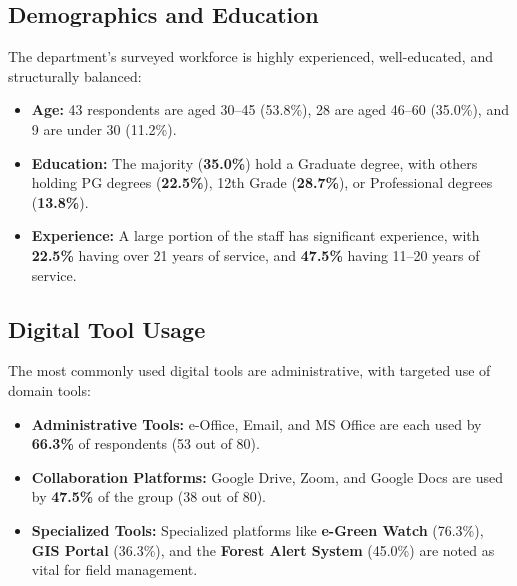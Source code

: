 \documentclass[10pt,a4paper]{article}
\begin{document}
\noindent\begin{minipage}[t]{0.49\textwidth}
\subsection{Demographics and Education}
The department's surveyed workforce is highly experienced, well-educated, and structurally balanced:
\begin{itemize}
  \item \textbf{Age:} 43 respondents are aged 30--45 (53.8\%), 28 are aged 46--60 (35.0\%), and 9 are under 30 (11.2\%).
  \item \textbf{Education:} The majority (\textbf{35.0\%}) hold a Graduate degree, with others holding PG degrees (\textbf{22.5\%}), 12th Grade (\textbf{28.7\%}), or Professional degrees (\textbf{13.8\%}).
  \item \textbf{Experience:} A large portion of the staff has significant experience, with \textbf{22.5\%} having over 21 years of service, and \textbf{47.5\%} having 11--20 years of service.
\end{itemize}
\end{minipage}
\hfill
\begin{minipage}[t]{0.49\textwidth}
\subsection{Digital Tool Usage}
The most commonly used digital tools are administrative, with targeted use of domain tools:
\begin{itemize}
  \item \textbf{Administrative Tools:} e-Office, Email, and MS Office are each used by \textbf{66.3\%} of respondents (53 out of 80).
  \item \textbf{Collaboration Platforms:} Google Drive, Zoom, and Google Docs are used by \textbf{47.5\%} of the group (38 out of 80).
  \item \textbf{Specialized Tools:} Specialized platforms like \textbf{e-Green Watch} (76.3\%), \textbf{GIS Portal} (36.3\%), and the \textbf{Forest Alert System} (45.0\%) are noted as vital for field management.
\end{itemize}
\end{minipage}

\vspace{0.05cm}
\end{document}
